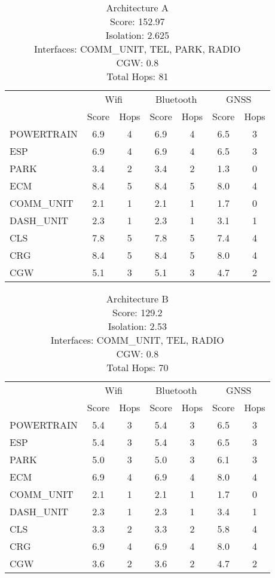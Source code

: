 \begin{table}[ht]
    \centering
    \caption{Architecture A \\ Score: 152.97 \\ Isolation: 2.625 \\ Interfaces: COMM\_UNIT, TEL, PARK, RADIO \\ CGW: 0.8 \\ Total Hops: 81}
    \label{tab:archA}
    \begin{tabular}{lcccccc}
    \hline
    & \multicolumn{2}{c}{Wifi} & \multicolumn{2}{c}{Bluetooth} & \multicolumn{2}{c}{GNSS} \\
    & Score & Hops & Score & Hops & Score & Hops \\
    \hline
        POWERTRAIN & 6.9 & 4 & 6.9 & 4 & 6.5 & 3 \\
        ESP & 6.9 & 4 & 6.9 & 4 & 6.5 & 3 \\
        PARK & 3.4 & 2 & 3.4 & 2 & 1.3 & 0 \\
        ECM & 8.4 & 5 & 8.4 & 5 & 8.0 & 4 \\
        COMM\_UNIT & 2.1 & 1 & 2.1 & 1 & 1.7 & 0 \\
        DASH\_UNIT & 2.3 & 1 & 2.3 & 1 & 3.1 & 1 \\
        CLS & 7.8 & 5 & 7.8 & 5 & 7.4 & 4 \\
        CRG & 8.4 & 5 & 8.4 & 5 & 8.0 & 4 \\
        CGW & 5.1 & 3 & 5.1 & 3 & 4.7 & 2 \\
    \hline
    \end{tabular}
\end{table}


\begin{table}[ht]
    \centering
    \caption{Architecture B \\ Score: 129.2 \\ Isolation: 2.53 \\ Interfaces: COMM\_UNIT, TEL, RADIO \\ CGW: 0.8 \\ Total Hops: 70}
    \label{tab:archB}
    \begin{tabular}{lcccccc}
    \hline
    & \multicolumn{2}{c}{Wifi} & \multicolumn{2}{c}{Bluetooth} & \multicolumn{2}{c}{GNSS} \\
    & Score & Hops & Score & Hops & Score & Hops \\
    \hline
        POWERTRAIN & 5.4 & 3 & 5.4 & 3 & 6.5 & 3 \\
        ESP & 5.4 & 3 & 5.4 & 3 & 6.5 & 3 \\
        PARK & 5.0 & 3 & 5.0 & 3 & 6.1 & 3 \\
        ECM & 6.9 & 4 & 6.9 & 4 & 8.0 & 4 \\
        COMM\_UNIT & 2.1 & 1 & 2.1 & 1 & 1.7 & 0 \\
        DASH\_UNIT & 2.3 & 1 & 2.3 & 1 & 3.4 & 1 \\
        CLS & 3.3 & 2 & 3.3 & 2 & 5.8 & 4 \\
        CRG & 6.9 & 4 & 6.9 & 4 & 8.0 & 4 \\
        CGW & 3.6 & 2 & 3.6 & 2 & 4.7 & 2 \\
    \hline
    \end{tabular}
\end{table}


